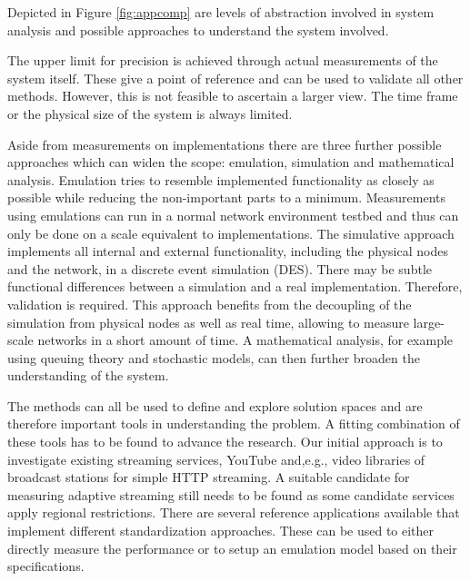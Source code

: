 Depicted in Figure \ref{fig:appcomp} are levels of abstraction involved in system analysis and possible approaches to understand the system involved.

The upper limit for precision is achieved through actual measurements of the system itself. These give a point of reference and can be used to validate all other methods. However, this is not feasible to ascertain a larger view. The time frame or the physical size of the system is always limited.

Aside from measurements on implementations there are three further possible approaches which can widen the scope: emulation, simulation and mathematical analysis. 
Emulation tries to resemble implemented functionality as closely as possible while reducing the non-important parts to a minimum. Measurements using emulations can run in a normal network environment testbed and thus can only be done on a scale equivalent to implementations. The simulative approach implements all internal and external functionality, including the physical nodes and the network, in a discrete event simulation (DES). There may be subtle functional differences between a simulation and a real implementation. Therefore, validation is required. This approach benefits from the decoupling of the simulation from physical nodes as well as real time, allowing to measure large-scale networks in a short amount of time.
A mathematical analysis, for example using queuing theory and stochastic models, can then further broaden the understanding of the system.


The methods can all be used to define and explore solution spaces and are therefore important tools in understanding the problem. A fitting combination of these tools has to be found to advance the research. Our initial approach is to investigate existing streaming services, YouTube \cite{metzger2011delivery,mok2011measuring} and,e.g., video libraries of broadcast stations for simple HTTP streaming. A suitable candidate for measuring adaptive streaming still needs to be found as some candidate services apply regional restrictions. There are several reference applications available that implement different standardization approaches. These can be used to either directly measure the performance or to setup an emulation model based on their specifications.



